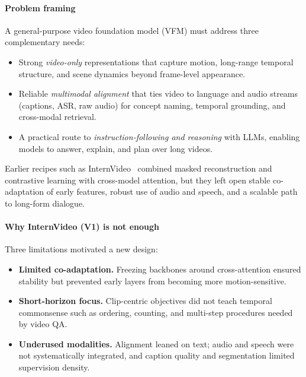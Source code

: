 \begin{enrichment}
\begin{enrichment}
        \paragraph{Problem framing}
        A general-purpose video foundation model (VFM) must address three complementary needs:
        \begin{itemize}
            \item Strong \emph{video-only} representations that capture motion, long-range temporal structure, and scene dynamics beyond frame-level appearance.
            \item Reliable \emph{multimodal alignment} that ties video to language and audio streams (captions, ASR, raw audio) for concept naming, temporal grounding, and cross-modal retrieval.
            \item A practical route to \emph{instruction-following and reasoning} with LLMs, enabling models to answer, explain, and plan over long videos.
        \end{itemize}
        Earlier recipes such as InternVideo~\cite{wang2022_internvideo} combined masked reconstruction and contrastive learning with cross-model attention, but they left open stable co-adaptation of early features, robust use of audio and speech, and a scalable path to long-form dialogue.
        
        \paragraph{Why InternVideo (V1) is not enough}
        Three limitations motivated a new design:
        \begin{itemize}
            \item \textbf{Limited co-adaptation.} Freezing backbones around cross-attention ensured stability but prevented early layers from becoming more motion-sensitive.
            \item \textbf{Short-horizon focus.} Clip-centric objectives did not teach temporal commonsense such as ordering, counting, and multi-step procedures needed by video QA.
            \item \textbf{Underused modalities.} Alignment leaned on text; audio and speech were not systematically integrated, and caption quality and segmentation limited supervision density.
        \end{itemize}
        

\end{enrichment}
\end{enrichment}
